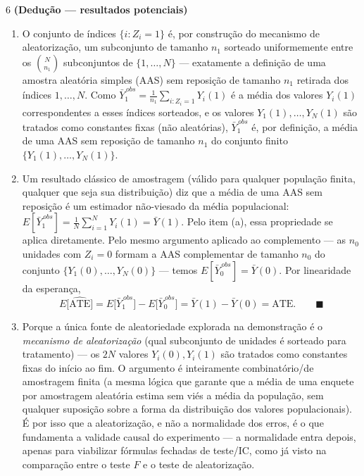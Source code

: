 \documentclass[11pt]{article}
\begin{document}
\begin{questao}{6} \textbf{(Dedução --- resultados potenciais)}
\end{questao}
\begin{solucao}
\begin{enumerate}[label=(\alph*)]
  \item O conjunto de índices $\{i : Z_i = 1\}$ é, por construção do mecanismo de aleatorização,
    um subconjunto de tamanho $n_1$ sorteado uniformemente entre os $\binom{N}{n_1}$ subconjuntos
    de $\{1,\dots,N\}$ --- exatamente a definição de uma amostra aleatória simples (AAS) sem
    reposição de tamanho $n_1$ retirada dos índices $1,\dots,N$. Como $\bar Y_1^{\,obs} =
    \tfrac{1}{n_1}\sum_{i:Z_i=1} Y_i(1)$ é a média dos valores $Y_i(1)$ correspondentes a esses
    índices sorteados, e os valores $Y_1(1),\dots,Y_N(1)$ são tratados como constantes fixas (não
    aleatórias), $\bar Y_1^{\,obs}$ é, por definição, a média de uma AAS sem reposição de tamanho
    $n_1$ do conjunto finito $\{Y_1(1),\dots,Y_N(1)\}$.

  \item Um resultado clássico de amostragem (válido para qualquer população finita, qualquer que
    seja sua distribuição) diz que a média de uma AAS sem reposição é um estimador não-viesado da
    média populacional: $E[\bar Y_1^{\,obs}] = \tfrac{1}{N}\sum_{i=1}^N Y_i(1) = \bar Y(1)$. Pelo
    item (a), essa propriedade se aplica diretamente. Pelo mesmo argumento aplicado ao
    complemento --- as $n_0$ unidades com $Z_i=0$ formam a AAS complementar de tamanho $n_0$ do
    conjunto $\{Y_1(0),\dots,Y_N(0)\}$ --- temos $E[\bar Y_0^{\,obs}] = \bar Y(0)$. Por
    linearidade da esperança,
    $$
    E\big[\widehat{\text{ATE}}\big] = E\big[\bar Y_1^{\,obs}\big] - E\big[\bar Y_0^{\,obs}\big]
    = \bar Y(1) - \bar Y(0) = \text{ATE}. \qquad \blacksquare
    $$

  \item Porque a única fonte de aleatoriedade explorada na demonstração é o \emph{mecanismo de
    aleatorização} (qual subconjunto de unidades é sorteado para tratamento) --- os $2N$ valores
    $Y_i(0), Y_i(1)$ são tratados como constantes fixas do início ao fim. O argumento é
    inteiramente combinatório/de amostragem finita (a mesma lógica que garante que a média de uma
    enquete por amostragem aleatória estima sem viés a média da população, sem qualquer suposição
    sobre a forma da distribuição dos valores populacionais). É por isso que a aleatorização, e
    não a normalidade dos erros, é o que fundamenta a validade causal do experimento --- a
    normalidade entra depois, apenas para viabilizar fórmulas fechadas de teste/IC, como já visto
    na comparação entre o teste $F$ e o teste de aleatorização.
\end{enumerate}
\end{solucao}
\end{document}
